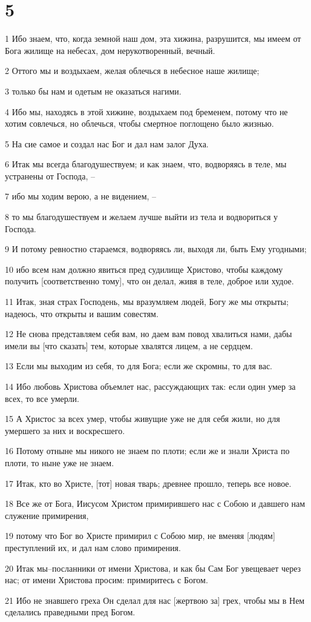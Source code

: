 \chapter{5}

\par 1 Ибо знаем, что, когда земной наш дом, эта хижина, разрушится, мы имеем от Бога жилище на небесах, дом нерукотворенный, вечный.
\par 2 Оттого мы и воздыхаем, желая облечься в небесное наше жилище;
\par 3 только бы нам и одетым не оказаться нагими.
\par 4 Ибо мы, находясь в этой хижине, воздыхаем под бременем, потому что не хотим совлечься, но облечься, чтобы смертное поглощено было жизнью.
\par 5 На сие самое и создал нас Бог и дал нам залог Духа.
\par 6 Итак мы всегда благодушествуем; и как знаем, что, водворяясь в теле, мы устранены от Господа, --
\par 7 ибо мы ходим верою, а не видением, --
\par 8 то мы благодушествуем и желаем лучше выйти из тела и водвориться у Господа.
\par 9 И потому ревностно стараемся, водворяясь ли, выходя ли, быть Ему угодными;
\par 10 ибо всем нам должно явиться пред судилище Христово, чтобы каждому получить [соответственно тому], что он делал, живя в теле, доброе или худое.
\par 11 Итак, зная страх Господень, мы вразумляем людей, Богу же мы открыты; надеюсь, что открыты и вашим совестям.
\par 12 Не снова представляем себя вам, но даем вам повод хвалиться нами, дабы имели вы [что сказать] тем, которые хвалятся лицем, а не сердцем.
\par 13 Если мы выходим из себя, то для Бога; если же скромны, то для вас.
\par 14 Ибо любовь Христова объемлет нас, рассуждающих так: если один умер за всех, то все умерли.
\par 15 А Христос за всех умер, чтобы живущие уже не для себя жили, но для умершего за них и воскресшего.
\par 16 Потому отныне мы никого не знаем по плоти; если же и знали Христа по плоти, то ныне уже не знаем.
\par 17 Итак, кто во Христе, [тот] новая тварь; древнее прошло, теперь все новое.
\par 18 Все же от Бога, Иисусом Христом примирившего нас с Собою и давшего нам служение примирения,
\par 19 потому что Бог во Христе примирил с Собою мир, не вменяя [людям] преступлений их, и дал нам слово примирения.
\par 20 Итак мы--посланники от имени Христова, и как бы Сам Бог увещевает через нас; от имени Христова просим: примиритесь с Богом.
\par 21 Ибо не знавшего греха Он сделал для нас [жертвою за] грех, чтобы мы в Нем сделались праведными пред Богом.

